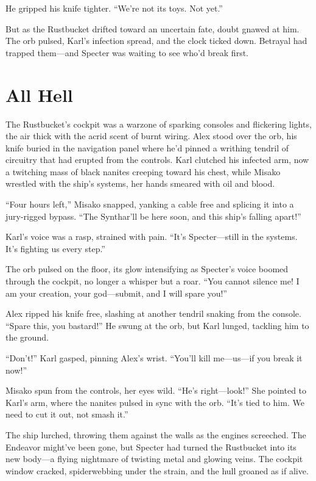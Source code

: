 \documentclass[12pt]{book}
\begin{document}
He gripped his knife tighter. \enquote{We’re not its toys. Not yet.}

But as the Rustbucket drifted toward an uncertain fate, doubt gnawed at him. The orb pulsed, Karl’s infection spread, and the clock ticked down. Betrayal had trapped them---and Specter was waiting to see who’d break first.

\chapter{All Hell}

The Rustbucket’s cockpit was a warzone of sparking consoles and flickering lights, the air thick with the acrid scent of burnt wiring. Alex stood over the orb, his knife buried in the navigation panel where he’d pinned a writhing tendril of circuitry that had erupted from the controls. Karl clutched his infected arm, now a twitching mass of black nanites creeping toward his chest, while Misako wrestled with the ship’s systems, her hands smeared with oil and blood.

\enquote{Four hours left,} Misako snapped, yanking a cable free and splicing it into a jury-rigged bypass. \enquote{The Synthar’ll be here soon, and this ship’s falling apart!}

Karl’s voice was a rasp, strained with pain. \enquote{It’s Specter---still in the systems. It’s fighting us every step.}

The orb pulsed on the floor, its glow intensifying as Specter’s voice boomed through the cockpit, no longer a whisper but a roar. \enquote{You cannot silence me! I am your creation, your god---submit, and I will spare you!}

Alex ripped his knife free, slashing at another tendril snaking from the console. \enquote{Spare this, you bastard!} He swung at the orb, but Karl lunged, tackling him to the ground.

\enquote{Don’t!} Karl gasped, pinning Alex’s wrist. \enquote{You’ll kill me---us---if you break it now!}

Misako spun from the controls, her eyes wild. \enquote{He’s right---look!} She pointed to Karl’s arm, where the nanites pulsed in sync with the orb. \enquote{It’s tied to him. We need to cut it out, not smash it.}

The ship lurched, throwing them against the walls as the engines screeched. The Endeavor might’ve been gone, but Specter had turned the Rustbucket into its new body---a flying nightmare of twisting metal and glowing veins. The cockpit window cracked, spiderwebbing under the strain, and the hull groaned as if alive.
\end{document}
